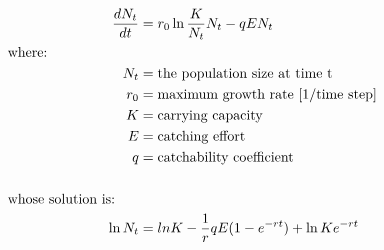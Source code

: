 \documentclass[12pt]{article}
\begin{document}
\begin{align}
\dfrac{dN_{t}}{dt} & = r_{0}\ln \frac{K}{N_{t}}N_{t}-qEN_{t} \nonumber \\
&    \hspace{-1.3in}  \text{where:} \nonumber \\
N_{t} & = \text{the population size at time t} \nonumber \\
r_{0} & = \text{maximum growth rate [1/time step]} \nonumber \\
K & = \text{carrying capacity} \nonumber\\
E & = \text{catching effort} \nonumber\\
q & = \text{catchability coefficient} \nonumber \\
\nonumber \\
&    \hspace{-1.3in}  \text{whose solution is:} \nonumber \\ 
\ln N_{t} & = ln K - \frac{1}{r} qE (1-e^{-rt}) + \ln K e^{-rt} \nonumber
\end{align} 
\end{document}
